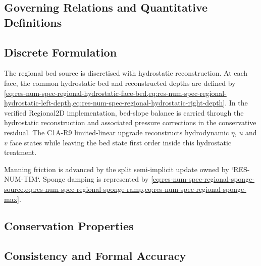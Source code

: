 \subsection{Governing Relations and Quantitative Definitions}
\label{sec:res-num-src-governing-relations}

%

\subsection{Discrete Formulation}
\label{sec:res-num-src-discrete-formulation}

The regional bed source is discretised with hydrostatic reconstruction.
At each face, the common hydrostatic bed and reconstructed depths are
defined by
\cref{eq:res-num-spec-regional-hydrostatic-face-bed,eq:res-num-spec-regional-hydrostatic-left-depth,eq:res-num-spec-regional-hydrostatic-right-depth}.
In the verified Regional2D implementation, bed-slope balance is carried
through the hydrostatic reconstruction and associated pressure
corrections in the conservative residual. The C1A-R9 limited-linear
upgrade reconstructs hydrodynamic $\eta$, $u$ and $v$ face states while
leaving the bed state first order inside this hydrostatic treatment.

Manning friction is advanced by the split semi-implicit update owned by
`RES-NUM-TIM`. Sponge damping is represented by
\cref{eq:res-num-spec-regional-sponge-source,eq:res-num-spec-regional-sponge-ramp,eq:res-num-spec-regional-sponge-max}.

\subsection{Conservation Properties}
\label{sec:res-num-src-conservation-properties}


\subsection{Consistency and Formal Accuracy}
\label{sec:res-num-src-consistency-formal-accuracy}


